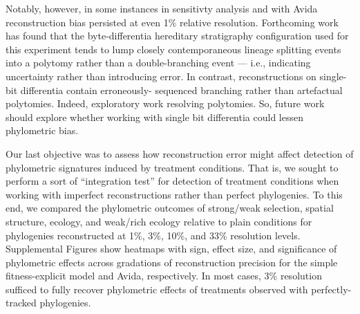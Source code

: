 Notably, however, in some instances in sensitivty analysis and with Avida reconstruction bias persisted at even 1\% relative resolution.
Forthcoming work has found that the byte-differentia  hereditary stratigraphy configuration used for this experiment tends to lump closely contemporaneous lineage splitting events into a polytomy rather than a double-branching event --- i.e., indicating uncertainty rather than introducing error.
In contrast, reconstructions on single-bit differentia contain erroneously- sequenced branching rather than artefactual polytomies.
Indeed, exploratory work resolving polytomies.
So, future work should explore whether working with single bit differentia could lessen phylometric bias.

Our last objective was to assess how reconstruction error might affect detection of phylometric signatures induced by treatment conditions.
That is, we sought to perform a sort of ``integration test'' for detection of treatment conditions when working with imperfect reconstructions rather than perfect phylogenies.
To this end, we compared the phylometric outcomes of strong/weak selection, spatial structure, ecology, and weak/rich ecology relative to plain conditions for phylogenies reconstructed at 1\%, 3\%, 10\%, and 33\% resolution levels.
Supplemental Figures  show heatmaps with sign, effect size, and significance of phylometric effects across gradations of reconstruction precision for the simple fitness-explicit model and Avida, respectively.
In most cases, 3\% resolution sufficed to fully recover phylometric effects of treatments observed with perfectly-tracked phylogenies.

